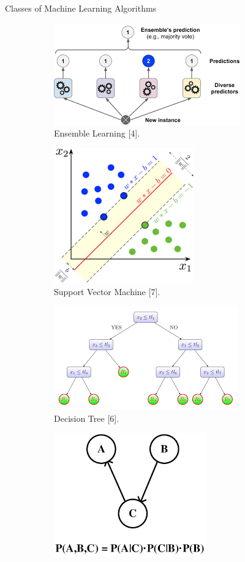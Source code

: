 \documentclass[compress,oilve]{beamer}
\begin{document}
\begin{frame}{Classes of Machine Learning Algorithms}
\begin{figure}
	\begin{subfigure}{0.16\textwidth}
\centering
 \includegraphics[scale=0.25]{24}  
 \caption{Ensemble Learning [4].}
	\end{subfigure}
          \hfill
	\begin{subfigure}{0.16\textwidth}
\centering
 \includegraphics[scale=0.25]{20}  
 \caption{Support Vector Machine [7].}
	\end{subfigure}
	\hfill
\begin{subfigure}{0.16\textwidth}
\centering
 \includegraphics[scale=0.25]{21}  
 \caption{Decision Tree [6].}
	\end{subfigure}
	\hfill
\begin{subfigure}{0.16\textwidth}
\centering
 \includegraphics[scale=0.25]{25}  

\end{subfigure}
\end{figure}
\end{frame}
\end{document}
